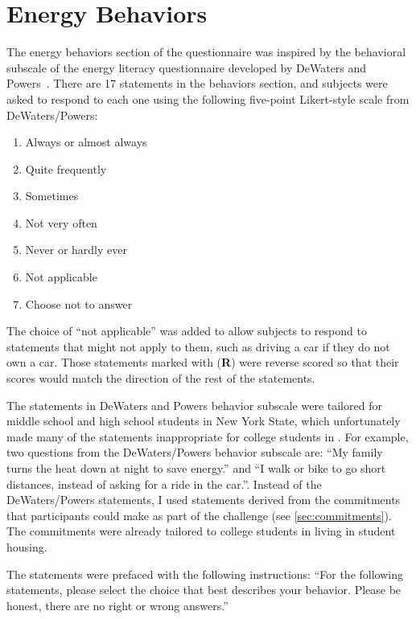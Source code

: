 \section{Energy Behaviors}
\label{sec:behavior-items}

The energy behaviors section of the questionnaire was inspired by the behavioral subscale of the energy literacy questionnaire developed by DeWaters and Powers~\cite{DeWaters2011}. There are 17 statements in the behaviors section, and subjects were asked to respond to each one using the following five-point Likert-style scale from DeWaters/Powers:

\begin{enumerate}
	\item Always or almost always
	\item Quite frequently
	\item Sometimes
	\item Not very often
	\item Never or hardly ever
	\item Not applicable
	\item Choose not to answer
\end{enumerate}

The choice of ``not applicable'' was added to allow subjects to respond to statements that might not apply to them, such as driving a car if they do not own a car. Those statements marked with (\textbf{R}) were reverse scored so that their scores would match the direction of the rest of the statements.

The statements in DeWaters and Powers behavior subscale were tailored for middle school and high school students in New York State, which unfortunately made many of the statements inappropriate for college students in \Hawaii. For example, two questions from the DeWaters/Powers behavior subscale are: ``My family turns the heat down at night to save energy.'' and ``I walk or bike to go short distances, instead of asking for a ride in the car.''. Instead of the DeWaters/Powers statements, I used statements derived from the commitments that participants could make as part of the challenge (see \autoref{sec:commitments}). The commitments were already tailored to college students in \Hawaii living in student housing. 

The statements were prefaced with the following instructions: ``For the following statements, please select the choice that best describes your behavior. Please be honest, there are no right or wrong answers.''

